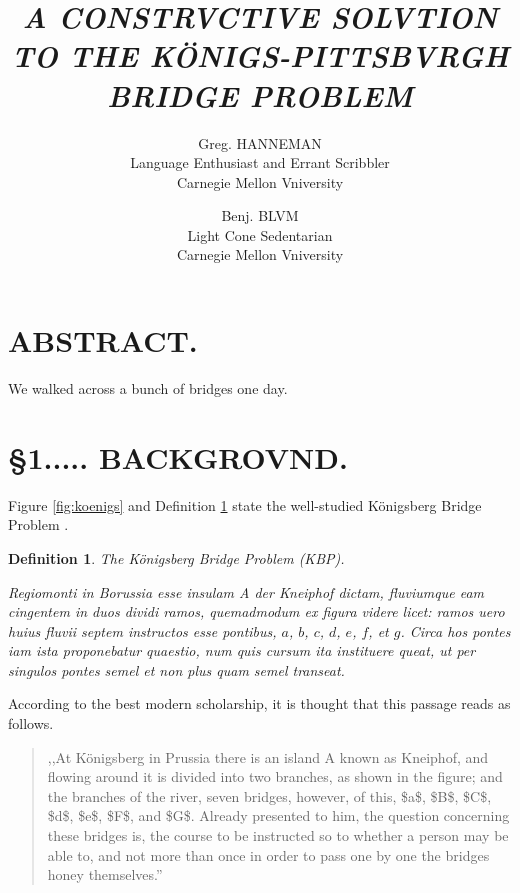 \documentclass[twocolumn]{article}
\title{\em \huge A CONSTRVCTIVE SOLVTION TO THE K\"ONIGS-PITTSBVRGH BRIDGE PROBLEM}
\author{Greg. HANNEMAN\\
	Language Enthusiast and Errant Scribbler
	\\
        Carnegie Mellon Vniversity
	\and
	Benj. BLVM \\
	Light Cone Sedentarian \\
	Carnegie Mellon Vniversity}
\date{}
\theoremstyle{plain}  %
\newtheorem{defn}{Definition}
\theoremstyle{definition}  %
\theoremstyle{remark}  %
\begin{document}

\maketitle
\pagestyle{empty}
\thispagestyle{empty}

\section*{ABSTRACT.}
	We walked across a bunch of bridges one day.



\section*{\S 1..... BACKGROVND.}

Figure \ref{fig:koenigs} and Definition \ref{Def-Konigs} state the well-studied K\"onigsberg Bridge Problem \cite{original}. %

\begin{defn} \label{Def-Konigs}
	The K\"onigsberg Bridge Problem (KBP). %

Regiomonti in Borussia esse insulam A {\em der Kneiphof} dictam, fluviumque eam cingentem in duos dividi ramos, quemadmodum ex figura videre licet: ramos uero huius fluvii septem instructos esse pontibus, $a$, $b$, $c$, $d$, $e$, $f$, et $g$.  Circa hos pontes iam ista proponebatur quaestio, num quis cursum ita instituere queat, ut per singulos pontes semel et non plus quam semel transeat.
\end{defn}

According to the best modern scholarship, it is thought that this passage reads as follows.

\begin{quote}
	,,At K\"onigsberg in Prussia there is an island A known as Kneiphof, and flowing around it is divided into two branches, as shown in the figure; and the branches of the river, seven bridges, however, of this, \$a\$, \$B\$, \$C\$, \$d\$, \$e\$, \$F\$, and \$G\$. Already presented to him, the question concerning these bridges is, the course to be instructed so to whether a person may be able to, and not more than once in order to pass one by one the bridges honey themselves.''
\end{quote}
\end{document}
